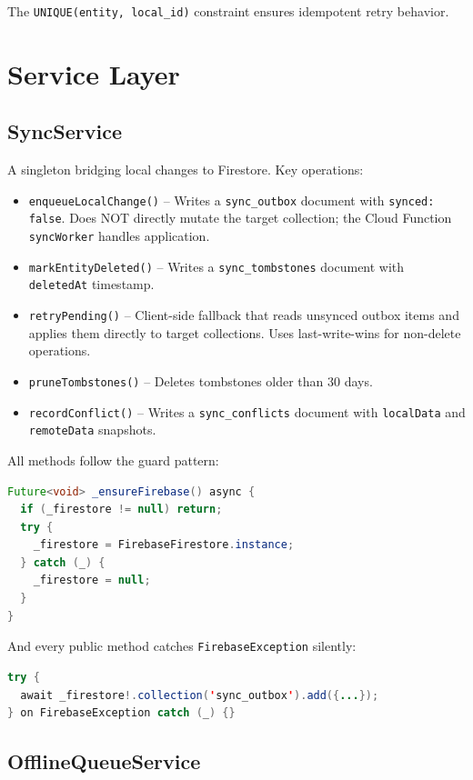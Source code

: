 \documentclass[12pt,a4paper,openany]{report}
\begin{document}
The \texttt{UNIQUE(entity, local\_id)} constraint ensures idempotent retry behavior.

\section{Service Layer}

\subsection{SyncService}

A singleton bridging local changes to Firestore. Key operations:

\begin{itemize}[leftmargin=*]
  \item \texttt{enqueueLocalChange()} -- Writes a \texttt{sync\_outbox} document with \texttt{synced: false}. Does NOT directly mutate the target collection; the Cloud Function \texttt{syncWorker} handles application.
  \item \texttt{markEntityDeleted()} -- Writes a \texttt{sync\_tombstones} document with \texttt{deletedAt} timestamp.
  \item \texttt{retryPending()} -- Client-side fallback that reads unsynced outbox items and applies them directly to target collections. Uses last-write-wins for non-delete operations.
  \item \texttt{pruneTombstones()} -- Deletes tombstones older than 30 days.
  \item \texttt{recordConflict()} -- Writes a \texttt{sync\_conflicts} document with \texttt{localData} and \texttt{remoteData} snapshots.
\end{itemize}

All methods follow the guard pattern:

\begin{lstlisting}[language=Java,caption={Firebase initialization guard pattern}]
Future<void> _ensureFirebase() async {
  if (_firestore != null) return;
  try {
    _firestore = FirebaseFirestore.instance;
  } catch (_) {
    _firestore = null;
  }
}
\end{lstlisting}

And every public method catches \texttt{FirebaseException} silently:
\begin{lstlisting}[language=Java]
try {
  await _firestore!.collection('sync_outbox').add({...});
} on FirebaseException catch (_) {}
\end{lstlisting}

\subsection{OfflineQueueService}
\end{document}
